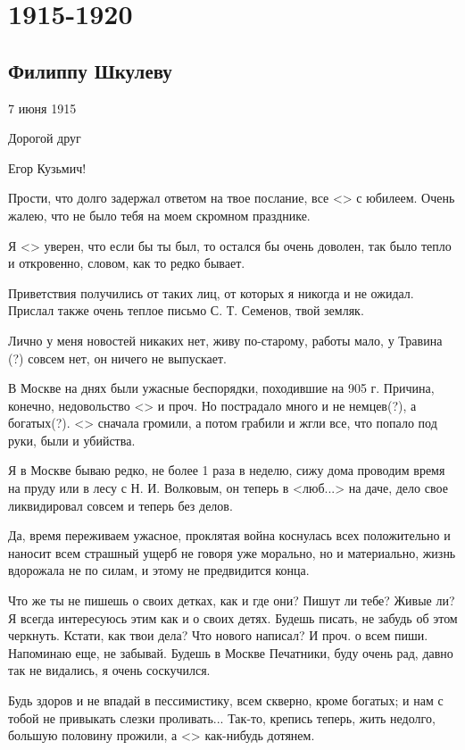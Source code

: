 \documentclass[]{memoir}
\begin{document}
\chapter{1915-1920}

\section{Филиппу Шкулеву}
                                            
7 июня 1915

Дорогой друг

Егор Кузьмич!

Прости, что долго задержал ответом на твое послание, все <> с юбилеем.
Очень жалею, что не было тебя на моем скромном празднике.

Я <> уверен, что если бы ты был, то остался бы очень доволен, так было тепло и откровенно, словом, как то редко бывает.

Приветствия получились от таких лиц, от которых я никогда и не ожидал. Прислал также очень теплое письмо С. Т. Семенов, твой земляк.

Лично у меня новостей никаких нет, живу по-старому, работы мало,  у Травина (?) совсем нет, он ничего не выпускает.

В Москве на днях были ужасные беспорядки, походившие на 905 г. Причина, конечно, недовольство <> и проч. Но пострадало много и не немцев(?), а богатых(?). <> сначала громили, а потом грабили и жгли все, что попало под руки, были и убийства.

Я в Москве бываю редко, не более 1 раза в неделю, сижу дома проводим время на пруду или в лесу с Н. И. Волковым, он теперь в <люб...> на даче, дело свое ликвидировал совсем и теперь без делов.

Да, время переживаем ужасное, проклятая война коснулась всех положительно и наносит всем страшный ущерб не говоря уже морально, но и материально, жизнь вдорожала не по силам, и этому не предвидится конца.

Что же ты не пишешь о своих детках, как и где они? Пишут ли тебе? Живые ли? Я всегда интересуюсь этим как и о своих детях. Будешь писать, не забудь об этом черкнуть. Кстати, как твои дела? Что нового написал? И проч. о всем пиши. Напоминаю еще, не забывай. Будешь в Москве Печатники, буду очень рад, давно так не видались, я очень соскучился.

Будь здоров и не впадай в пессимистику, всем скверно, кроме богатых; и нам с тобой не привыкать слезки проливать... Так-то, крепись теперь, жить недолго, большую половину прожили, а <> как-нибудь дотянем.
\end{document}
